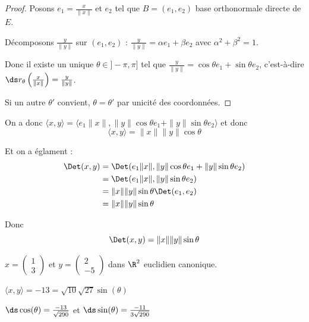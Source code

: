 
\begin{proof}
    Posons $e_1 = \frac x {\| x \|}$ et $e_2$ tel que $B = (e_1, e_2)$ base orthonormale directe de $E$.

    Décomposons $\frac y {\| y \|}$ sur $(e_1, e_2)$ : 
    $\frac y {\| y \|} = \alpha e_1 + \beta e_2$ avec $\alpha^2 + \beta^2 = 1$.

    Donc il existe un unique $\theta \in ]- \pi, \pi]$ tel que $\frac y {\| y \|} = \cos \theta e_1 + \sin \theta e_2$, 
    c'est-à-dire $\ds r_\theta\left( \frac x {\| x \|} \right) = \frac y {\| y \|}$.

    Si un autre $\theta'$ convient, $\theta = \theta'$ par unicité des coordonnées. 
\end{proof}

On a donc $\langle x, y \rangle = \langle e_1 \| x \|, \| y \| \cos \theta e_1 + \| y \| \sin \theta e_2 \rangle$
et donc 
$$\langle x, y \rangle = \| x \| \| y \| \cos \theta$$

Et on a églament : 
\begin{align}
    \Det(x, y) & = \Det(e_1 \| x \|, \| y \| \cos \theta e_1 + \| y \| \sin \theta e_2) \\
    & = \Det(e_1 \| x \|, \| y \| \sin \theta e_2) \\
    & = \| x \| \| y \| \sin \theta \Det(e_1, e_2) \\
    & = \| x \| \| y \| \sin \theta
\end{align}

Donc 
$$\Det(x, y) = \| x \| \| y \| \sin \theta$$

\begin{exemple}
    $x = \begin{pmatrix}
        1 \\ 3
    \end{pmatrix}$ et $y = \begin{pmatrix}
        2 \\ -5
    \end{pmatrix}$ dans $\R^2$ euclidien canonique.

    $\langle x, y \rangle = -13 = \sqrt {10} \sqrt{27} \sin(\theta)$

    $\ds \cos(\theta) = \frac{- 13}{\sqrt{290}}$ et $\ds \sin(\theta) = \frac{- 11}{3\sqrt{290}}$
\end{exemple}

